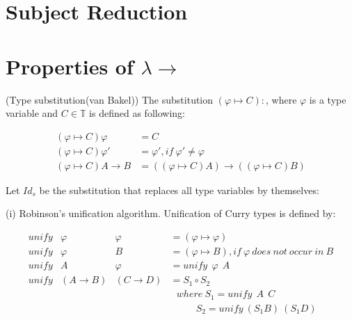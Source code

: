 \section{Subject Reduction}

\section{Properties of $\lambda \rightarrow $}

\begin{def1}{\label{def:tsub}}
\normalfont (Type substitution(van Bakel\cite{svb2001type})) The substitution $(\varphi \mapsto C): $, where $\varphi$ is a type variable and $C \in \mathbb{T}$ is defined as following:
\end{def1}

\begin{equation*}
\begin{array}{ll}
(\varphi \mapsto C)\varphi        & = C\\
(\varphi \mapsto C)\varphi '      & = \varphi ',if\ \varphi '\neq \varphi\\
(\varphi \mapsto C)A\rightarrow B & = ((\varphi \mapsto C)A)\rightarrow ((\varphi \mapsto C)B)
\end{array}
\end{equation*}


\begin{def1}\label{eq:rob}
\normalfont Let $Id_s$ be the substitution that replaces all type variables by themselves:
\end{def1}

\noindent (i) Robinson's unification algorithm. Unification of Curry types is defined by:

\begin{equation*}
\begin{array}{llll}
unify & \varphi            & \varphi          & = (\varphi \mapsto \varphi)\\
unify & \varphi            & B                & = (\varphi \mapsto B), if\ \varphi \ does\ not\ occur\ in\ B\\
unify & A                  & \varphi          & = unify\ \ \varphi\ \ A\\
unify & (A\rightarrow B)   & (C\rightarrow D) & = S_1\circ S_2\\
&&&\ \ \ where\ S_1 = unify\ \ A\ \ C\\
&&&\ \ \ \ \ \ \ \ \ \ \ \ S_2 = unify\ (S_1B)\ (S_1D)
\end{array}
\end{equation*}


